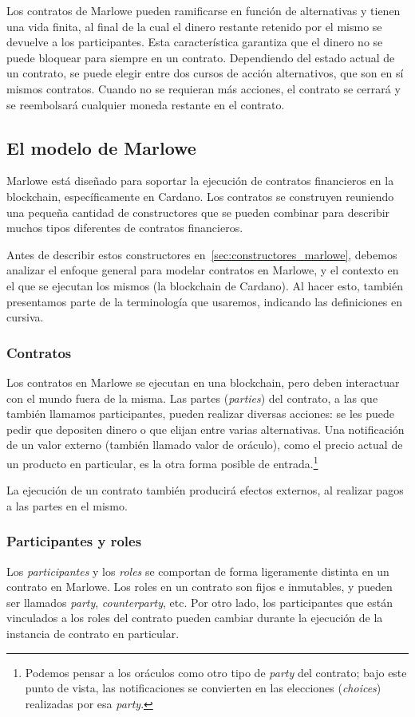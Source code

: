 \documentclass[12pt]{book}
\begin{document}
Los contratos de Marlowe pueden ramificarse en función de alternativas y tienen una vida finita, al final de la cual el dinero restante retenido por el mismo se devuelve a los participantes. Esta característica garantiza que el dinero no se puede bloquear para siempre en un contrato. Dependiendo del estado actual de un contrato, se puede elegir entre dos cursos de acción alternativos, que son en sí mismos contratos. Cuando no se requieran más acciones, el contrato se cerrará y se reembolsará cualquier moneda restante en el contrato.

\subsection{El modelo de Marlowe}

Marlowe está diseñado para soportar la ejecución de contratos financieros en la blockchain, específicamente en Cardano. Los contratos se construyen reuniendo una pequeña cantidad de constructores que se pueden combinar para describir muchos tipos diferentes de contratos financieros.

Antes de describir estos constructores en~\ref{sec:constructores_marlowe}, debemos analizar el enfoque general para modelar contratos en Marlowe, y el contexto en el que se ejecutan los mismos (la blockchain de Cardano). Al hacer esto, también presentamos parte de la terminología que usaremos, indicando las definiciones en cursiva.

\subsubsection{Contratos}
Los contratos en Marlowe se ejecutan en una blockchain, pero deben interactuar con el mundo fuera de la misma. Las partes (\textit{parties}) del contrato, a las que también llamamos participantes, pueden realizar diversas acciones: se les puede pedir que depositen dinero o que elijan entre varias alternativas. Una notificación de un valor externo (también llamado valor de oráculo), como el precio actual de un producto en particular, es la otra forma posible de entrada.\footnote{Podemos pensar a los oráculos como otro tipo de \textit{party} del contrato; bajo este punto de vista, las notificaciones se convierten en las elecciones (\textit{choices}) realizadas por esa \textit{party}.}

La ejecución de un contrato también producirá efectos externos, al realizar pagos a las partes en el mismo.

\subsubsection{Participantes y roles}
Los \textit{participantes} y los \textit{roles} se comportan de forma ligeramente distinta en un contrato en Marlowe. Los roles en un contrato son fijos e inmutables, y pueden ser llamados \textit{party}, \textit{counterparty}, etc. Por otro lado, los participantes que están vinculados a los roles del contrato pueden cambiar durante la ejecución de la instancia de contrato en particular.
\end{document}
